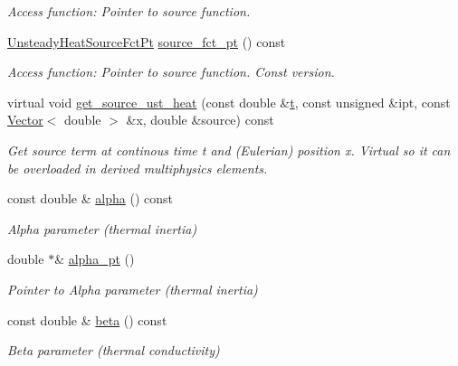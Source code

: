 \begin{DoxyCompactItemize}
\begin{DoxyCompactList}\small\item\em Access function\+: Pointer to source function. \end{DoxyCompactList}\item 
\hyperlink{classoomph_1_1UnsteadyHeatEquations_a967135cc2be2cb4b16fe0dc0b4d68a68}{Unsteady\+Heat\+Source\+Fct\+Pt} \hyperlink{classoomph_1_1UnsteadyHeatEquations_a97883b388b84d415b8954ce9670f73af}{source\+\_\+fct\+\_\+pt} () const
\begin{DoxyCompactList}\small\item\em Access function\+: Pointer to source function. Const version. \end{DoxyCompactList}\item 
virtual void \hyperlink{classoomph_1_1UnsteadyHeatEquations_a8907d972136ac4e81f297b196968ebe8}{get\+\_\+source\+\_\+ust\+\_\+heat} (const double \&\hyperlink{cfortran_8h_af6f0bd3dc13317f895c91323c25c2b8f}{t}, const unsigned \&ipt, const \hyperlink{classoomph_1_1Vector}{Vector}$<$ double $>$ \&x, double \&source) const
\begin{DoxyCompactList}\small\item\em Get source term at continous time t and (Eulerian) position x. Virtual so it can be overloaded in derived multiphysics elements. \end{DoxyCompactList}\item 
const double \& \hyperlink{classoomph_1_1UnsteadyHeatEquations_a840e6d385ae22b44795f73fdd008fc3e}{alpha} () const
\begin{DoxyCompactList}\small\item\em Alpha parameter (thermal inertia) \end{DoxyCompactList}\item 
double $\ast$\& \hyperlink{classoomph_1_1UnsteadyHeatEquations_ac1607b3b8cf1a1cd52b61f8bbc45a210}{alpha\+\_\+pt} ()
\begin{DoxyCompactList}\small\item\em Pointer to Alpha parameter (thermal inertia) \end{DoxyCompactList}\item 
const double \& \hyperlink{classoomph_1_1UnsteadyHeatEquations_aca11360903e1f4c7513e1f91e8a1e4b7}{beta} () const
\begin{DoxyCompactList}\small\item\em Beta parameter (thermal conductivity) \end{DoxyCompactList}\item 

\end{DoxyCompactItemize}

